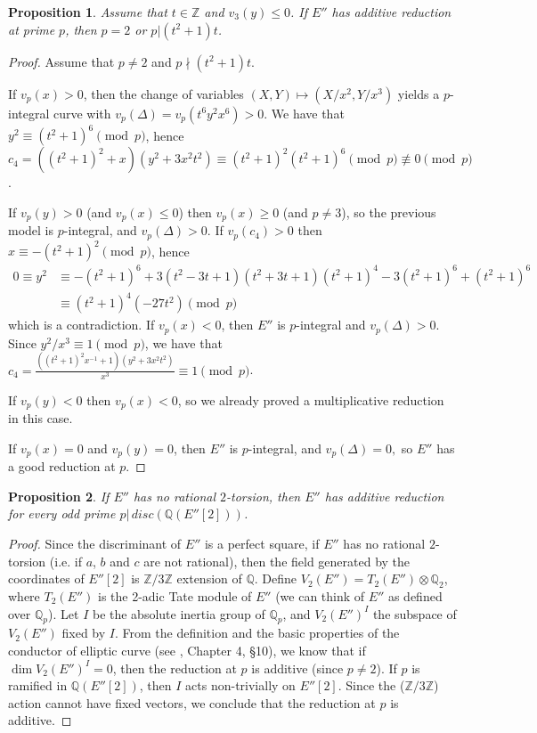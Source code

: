\documentclass[11pt]{amsart}
\theoremstyle{plain}
\newtheorem{proposition}{Proposition}
\theoremstyle{remark}
\begin{document}
\begin{proposition}
\label{prop:additive}
Assume that $t \in \mathbb{Z}$ and $v_3(y) \le 0$.
If $E''$ has additive reduction at prime $p$, then $p=2$ or $p|(t^2+1)t$.
\end{proposition}

\begin{proof}
Assume that $p\ne 2$ and $p \nmid (t^2+1)t$.

If $v_p(x)>0$, then the change of variables $(X,Y)\mapsto (X/x^2, Y/x^3)$ yields a $p$-integral curve with $v_p(\Delta)=v_p(t^6y^2x^6)>0$. We have that $y^2\equiv (t^2+1)^6 \pmod{p}$, hence $c_4 = ((t^2+1)^2+x)(y^2+3x^2t^2)\equiv (t^2+1)^2(t^2+1)^6 \pmod{p}\not \equiv 0 \pmod{p}$.

If $v_p(y)>0$ (and $v_p(x)\le 0$) then $v_p(x)\ge 0$ (and $p\ne 3$), so the previous model is $p$-integral, and $v_p(\Delta)>0$. If $v_p(c_4)>0$ then $x \equiv -(t^2+1)^2 \pmod{p}$, hence
\begin{align*}
0\equiv y^2&\equiv-(t^2+1)^6+3(t^2-3t+1)(t^2+3t+1)(t^2+1)^4-3(t^2+1)^6+(t^2+1)^6\\
&\equiv (t^2+1)^4(-27t^2) \pmod{p}
\end{align*}
which is a contradiction.
If $v_p(x)<0$, then $E''$ is $p$-integral and $v_p(\Delta)>0$. Since $y^2/x^3 \equiv 1 \pmod{p}$, we have that $c_4 = \displaystyle \frac{((t^2+1)^2x^{-1}+1)(y^2+3x^2t^2)}{x^3}\equiv 1 \pmod{p}$.

If $v_p(y)<0$ then $v_p(x)<0$, so we already proved a multiplicative reduction in this case.

If $v_p(x)=0$ and $v_p(y)=0$, then $E''$ is $p$-integral, and $v_p(\Delta)=0,$ so $E''$ has a good reduction at $p$.
\end{proof}

\begin{proposition}
\label{prop:inertia}
If $E''$ has no rational $2$-torsion, then $E''$ has additive reduction for every odd prime $p|\, disc(\mathbb{Q}(E''[2]))$.
\end{proposition}

\begin{proof}
Since the discriminant of $E''$ is a perfect square, if $E''$ has no rational $2$-torsion (i.e. if $a$, $b$ and $c$ are not rational), then the field generated by the coordinates of $E''[2]$ is $\mathbb{Z}/3\mathbb{Z}$ extension of $\mathbb{Q}$. Define $V_2(E'')=T_2(E'')\otimes \mathbb{Q}_2$, where $T_2(E'')$ is the 2-adic Tate module of $E''$ (we can think of $E''$ as defined over $\mathbb{Q}_p$). Let $I$ be the absolute inertia group of $\mathbb{Q}_p$, and $V_2(E'')^I$ the subspace of $V_2(E'')$ fixed by $I$.
From the definition and the basic properties of the conductor of elliptic curve (see \cite{Sil2}, Chapter 4, \S 10), we know that if $\dim V_2(E'')^I=0$, then the reduction at $p$ is additive (since $p\ne 2$). If $p$ is ramified in $\mathbb{Q}(E''[2])$, then $I$ acts non-trivially on $E''[2]$. Since the ($\mathbb{Z}/3\mathbb{Z}$) action cannot have fixed vectors, we conclude that the reduction at $p$ is additive.
\end{proof}
\end{document}
